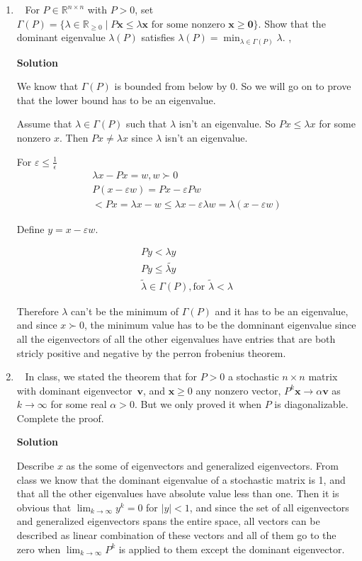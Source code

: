 \documentclass[11pt]{article}
\newcommand\score[1]{\marginpar{\vspace{-2ex}\color{blue}{#1/3}}\hspace{-1ex}}
\newcommand\0{\mathbf{0}}
\newcommand\RR{\mathbb{R}}
\newcommand\vv{\mathbf{v}}
\newcommand\xx{\mathbf{x}}
\newcommand\<{\langle}
\renewcommand\>{\rangle}
\begin{document}
\begin{enumerate}
\item\ \score{3}%
For $P \in \RR^{n \times n}$ with $P > 0$, set $\Gamma(P) = \{\lambda
\in \RR_{\geq 0} \mid P\xx \leq \lambda\xx \text{ for some nonzero }
\xx \geq \0\}$.  Show that the dominant eigenvalue $\lambda(P)$
satisfies $\lambda(P) = \min_{\lambda\in\Gamma(P)} \lambda$.
,

\textbf{Solution}

We know that $\Gamma(P)$ is bounded from below by 0. 
So we will go on to prove that the lower bound has to be an eigenvalue. 

Assume that $\lambda \in \Gamma(P)$ such that $\lambda$ isn't an eigenvalue.
So $Px\leq \lambda x$ for some nonzero $x$. Then $Px\neq \lambda x$ since $\lambda$ isn't an eigenvalue.

For $\varepsilon \leq \frac{1}{\epsilon}$
\begin{align*}
  \lambda x- Px = w, w\succ 0\\
  P(x - \varepsilon w) = Px-\varepsilon P w \\
  <  Px = \lambda x - w \leq \lambda x - \varepsilon \lambda w = \lambda (x- \varepsilon w)
\end{align*}

Define $y=x-\varepsilon w$.

\begin{align*}
Py < \lambda y\\
Py\leq \tilde{\lambda y}\\
\tilde{\lambda } \in \Gamma(P), \text{for } \tilde{\lambda} < \lambda
\end{align*}

Therefore $\lambda$ can't be the minimum of $\Gamma(P)$ and it has to be an eigenvalue, and since $x \succ 0$, the minimum value 
has to be the domninant eigenvalue since all the eigenvectors of all the other eigenvalues have entries that are both stricly positive and negative 
by the perron frobenius theorem.
\item\ \score{3}%
In class, we stated the theorem that for $P > 0$ a stochastic $n
\times n$ matrix with dominant eigenvector~$\vv$, and $\xx \geq 0$ any
nonzero vector, $P^k\xx \to \alpha\vv$ as $k\to\infty$ for some real
$\alpha > 0$.  But we only proved it when $P$ is diagonalizable.
Complete the proof.

\textbf{Solution}

Describe $x$ as the some of eigenvectors and generalized eigenvectors. From 
class we know that the dominant eigenvalue of a stochastic matrix is 1, and that 
all the other eigenvalues have absolute value less than one. Then it is obvious that 
$\lim_{k\rightarrow \infty} y^{k}=0$ for $|y|<1$, and since the set of all eigenvectors 
and generalized eigenvectors spans the entire space, all vectors can be described as 
linear combination of these vectors and all of them go to the zero when $\lim_{k\rightarrow \infty}P^{k}$ is applied to 
them except the dominant eigenvector.


\end{enumerate}
\end{document}
